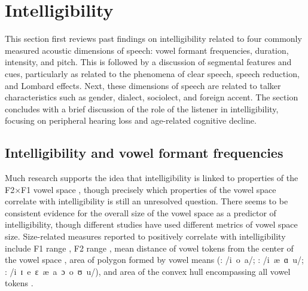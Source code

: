 
\section{Intelligibility}
This section first reviews past findings on intelligibility related to four commonly measured acoustic dimensions of speech: vowel formant frequencies, duration, intensity, and pitch.  This is followed by a discussion of segmental features and cues, particularly as related to the phenomena of clear speech, speech reduction, and Lombard effects.  Next, these dimensions of speech are related to talker characteristics such as gender, dialect, sociolect, and foreign accent.  The section concludes with a brief discussion of the role of the listener in intelligibility, focusing on peripheral hearing loss and age-related cognitive decline.%


\subsection{Intelligibility and vowel formant frequencies\label{sec:IntelVowel}}
Much research supports the idea that intelligibility is linked to properties of the F2×F1 vowel space \citep[\eg][]{BondMoore1994, BradlowEtAl1996, HazanMarkham2004, Neel2008, McCloyEtAl2013}, though precisely which properties of the vowel space correlate with intelligibility is still an unresolved question.  There seems to be consistent evidence for the overall size of the vowel space as a predictor of intelligibility, though different studies have used different metrics of vowel space size.  Size-related measures reported to positively correlate with intelligibility include F1 range \citep{BradlowEtAl1996}, F2 range \citep{HazanMarkham2004}, mean distance of vowel tokens from the center of the vowel space \citep{BradlowEtAl1996, McCloyEtAl2013}, area of polygon formed by vowel means (\citealt{BradlowEtAl1996}: /i~o~a/; \citealt{Neel2008}: /i~æ~ɑ~u/;  \citealt{McCloyEtAl2012}: /i~ɪ~e~ɛ~æ~a~ɔ~o~ʊ~u/), and area of the convex hull encompassing all vowel tokens \citep{McCloyEtAl2013}.  

